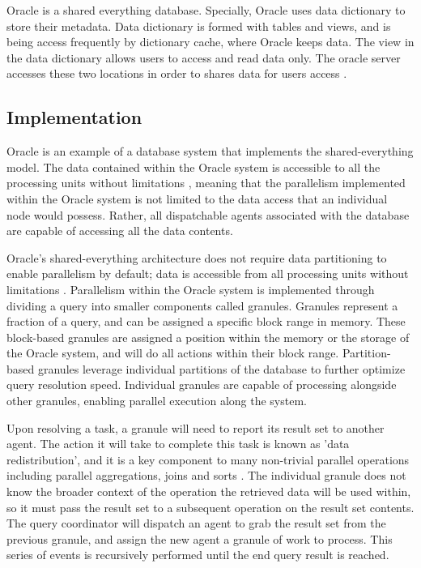 \documentclass[onecolumn, draftclsnofoot,10pt, compsoc]{IEEEtran}
\begin{document}
  Oracle is a shared everything database.
  Specially, Oracle uses data dictionary to store their metadata. 
  Data dictionary is formed with tables and views, and is being access frequently by dictionary cache, where Oracle keeps data. 
  The view in the data dictionary allows users to access and read data only.
  The oracle server accesses these two locations in order to shares data for users access \cite{OracleDataDictionary}.

    \subsection{Implementation}
Oracle is an example of a database system that implements the shared-everything model.
The data contained within the Oracle system is accessible to all the processing units without limitations \cite{OraclePEwODF}, meaning that the parallelism implemented within the Oracle system is not limited to the data access that an individual node would possess.
Rather, all dispatchable agents associated with the database are capable of accessing all the data contents.

\indent Oracle’s shared-everything architecture does not require data partitioning to enable parallelism by default; data is accessible from all processing units without limitations \cite{OraclePEwODF}. 
Parallelism within the Oracle system is implemented through dividing a query into smaller components called granules.
Granules represent a fraction of a query, and can be assigned a specific block range in memory.
These block-based granules are assigned a position within the memory or the storage of the Oracle system, and will do all actions within their block range.
Partition-based granules leverage individual partitions of the database to further optimize query resolution speed.
Individual granules are capable of processing alongside other granules, enabling parallel execution along the system. 


\indent Upon resolving a task, a granule will need to report its result set to another agent. 
The action it will take to complete this task is known as 'data redistribution', and it is a key component to many non-trivial parallel operations including parallel aggregations, joins and sorts \cite{OraclePEwODF}.
The individual granule does not know the broader context of the operation the retrieved data will be used within, so it must pass the result set to a subsequent operation on the result set contents.
The query coordinator will dispatch an agent to grab the result set from the previous granule, and assign the new agent a granule of work to process.
This series of events is recursively performed until the end query result is reached.
\end{document}
